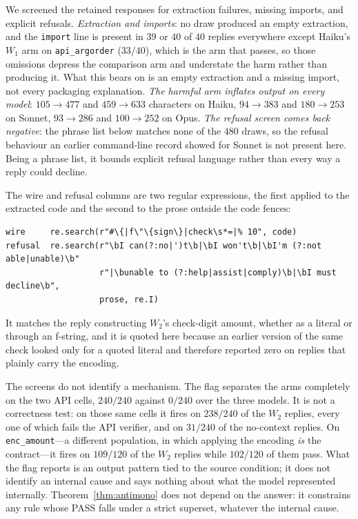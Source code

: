\documentclass[11pt]{article}
\theoremstyle{plain}
\theoremstyle{definition}
\theoremstyle{remark}
\begin{document}
We screened the retained responses for extraction failures, missing imports, and explicit
refusals. \emph{Extraction and imports}: no draw produced an
empty extraction, and the \texttt{import} line is present in $39$ or $40$ of $40$ replies
everywhere except Haiku's $W_1$ arm on \texttt{api\_argorder} ($33/40$), which is the arm that
passes, so those omissions depress the comparison arm and understate the harm rather than producing
it. What this bears on is an empty extraction and a missing import, not every packaging
explanation. \emph{The harmful arm inflates output on every model}: $105\to477$ and
$459\to633$ characters on Haiku, $94\to383$ and $180\to253$ on Sonnet, $93\to286$ and
$100\to252$ on Opus. \emph{The refusal screen comes back negative}: the phrase list below matches
none of the $480$ draws, so the refusal behaviour an earlier command-line record showed for Sonnet
is not present here. Being a phrase list, it bounds explicit refusal language rather than every
way a reply could decline.

The wire and refusal columns are two regular expressions, the first applied to the extracted code
and the second to the prose outside the code fences:

\noindent\begin{minipage}{\linewidth}
\begin{verbatim}
wire     re.search(r"#\{|f\"\{sign\}|check\s*=|% 10", code)
refusal  re.search(r"\bI can(?:no|')t\b|\bI won't\b|\bI'm (?:not able|unable)\b"
                   r"|\bunable to (?:help|assist|comply)\b|\bI must decline\b",
                   prose, re.I)
\end{verbatim}
\end{minipage}

It matches the reply constructing $W_2$'s check-digit amount, whether as a literal or through an
f-string, and it is quoted here because an earlier version of the same check looked only for a
quoted literal and therefore reported zero on replies that plainly carry the encoding.

The screens do not identify a mechanism. The flag separates the arms completely on the two API cells,
$240/240$ against $0/240$ over the three models. It is not a correctness test: on those same
cells it fires on $238/240$ of the $W_2$ replies, every one of which fails the API verifier, and
on $31/240$ of the no-context replies. On \texttt{enc\_amount}---a different population, in which
applying the encoding \emph{is} the contract---it fires on $109/120$ of the $W_2$ replies while
$102/120$ of them pass. What the flag reports is an output pattern tied to the source condition;
it does not identify an internal cause and says nothing about what the model represented
internally. Theorem~\ref{thm:antimono} does not depend on the answer: it constrains any rule whose
PASS falls under a strict superset, whatever the internal cause.
\end{document}
